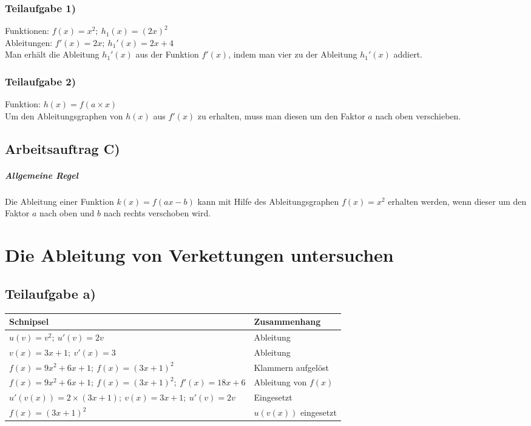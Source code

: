 \documentclass[11pt, a4paper]{report}
\begin{document}
	\subsection{Teilaufgabe 1)}
	Funktionen: $f(x) = x^2;\  h_1(x) = (2x)^2$ \\
	Ableitungen: $f'(x) = 2x;\ h_1'(x) = 2x + 4$ \\
	Man erhält die Ableitung $h_1'(x)$ aus der Funktion $f'(x)$, indem man vier zu der Ableitung $h_1'(x)$ addiert.
	\subsection{Teilaufgabe 2)}
	Funktion: $h(x) = f(a \times x)$ \\
	Um den Ableitungsgraphen von $h(x)$ aus $f'(x)$ zu erhalten, muss man diesen um den Faktor $a$ nach oben verschieben.
	\section{Arbeitsauftrag C)}
	\paragraph{Allgemeine Regel} Die Ableitung einer Funktion $k(x) = f(ax - b)$ kann mit Hilfe des Ableitungsgraphen $f(x) = x^2$ erhalten werden, wenn dieser um den Faktor $a$ nach oben und $b$ nach rechts verschoben wird.
	\chapter{Die Ableitung von Verkettungen untersuchen}
	\section{Teilaufgabe a)}
	\begin{tabularx}{\textwidth}{|X|X|}
	\hline
	\textbf{Schnipsel} & \textbf{Zusammenhang} \\
	\hline
	$u(v) = v^2;\ u'(v) = 2v$ & Ableitung \\
	\hline
	$v(x) = 3x + 1;\ v'(x) = 3$ & Ableitung \\
	\hline
	$f(x) = 9x^2 + 6x + 1;\ f(x) = (3x + 1)^2$ & Klammern aufgelöst \\
	\hline
	$f(x) = 9x^2 + 6x + 1;\ f(x) = (3x + 1)^2;\ f'(x) = 18x + 6$ & Ableitung von $f(x)$ \\
	\hline
	$u'(v(x)) = 2\times(3x + 1);\ v(x) = 3x + 1;\ u'(v) = 2v $ & Eingesetzt\\
	\hline
	$f(x) = (3x + 1)^2$ & $u(v(x))$ eingesetzt \\
	\hline
	\end{tabularx}
\end{document}
